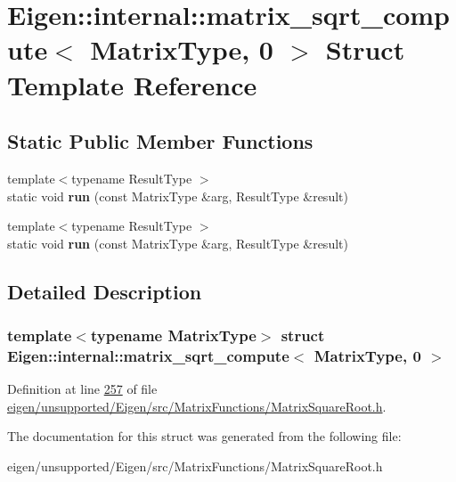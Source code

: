 \hypertarget{struct_eigen_1_1internal_1_1matrix__sqrt__compute_3_01_matrix_type_00_010_01_4}{}\section{Eigen\+:\+:internal\+:\+:matrix\+\_\+sqrt\+\_\+compute$<$ Matrix\+Type, 0 $>$ Struct Template Reference}
\label{struct_eigen_1_1internal_1_1matrix__sqrt__compute_3_01_matrix_type_00_010_01_4}
\subsection*{Static Public Member Functions}
\begin{DoxyCompactItemize}
\item 
\mbox{\label{struct_eigen_1_1internal_1_1matrix__sqrt__compute_3_01_matrix_type_00_010_01_4_af5aad5939c4ee7f180741ae7cb79fb3b}} 
{\footnotesize template$<$typename Result\+Type $>$ }\\static void {\bfseries run} (const Matrix\+Type \&arg, Result\+Type \&result)
\item 
\mbox{\label{struct_eigen_1_1internal_1_1matrix__sqrt__compute_3_01_matrix_type_00_010_01_4_af5aad5939c4ee7f180741ae7cb79fb3b}} 
{\footnotesize template$<$typename Result\+Type $>$ }\\static void {\bfseries run} (const Matrix\+Type \&arg, Result\+Type \&result)
\end{DoxyCompactItemize}


\subsection{Detailed Description}
\subsubsection*{template$<$typename Matrix\+Type$>$\newline
struct Eigen\+::internal\+::matrix\+\_\+sqrt\+\_\+compute$<$ Matrix\+Type, 0 $>$}



Definition at line \hyperlink{eigen_2unsupported_2_eigen_2src_2_matrix_functions_2_matrix_square_root_8h_source_l00257}{257} of file \hyperlink{eigen_2unsupported_2_eigen_2src_2_matrix_functions_2_matrix_square_root_8h_source}{eigen/unsupported/\+Eigen/src/\+Matrix\+Functions/\+Matrix\+Square\+Root.\+h}.



The documentation for this struct was generated from the following file\+:\begin{DoxyCompactItemize}
\item 
eigen/unsupported/\+Eigen/src/\+Matrix\+Functions/\+Matrix\+Square\+Root.\+h\end{DoxyCompactItemize}
